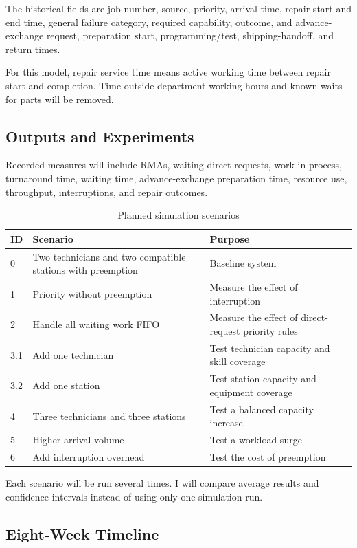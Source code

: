 \documentclass[12pt, letterpaper, twoside]{article}
\begin{document}
The historical fields are job number, source, priority, arrival time,
repair start and end time, general failure category, required capability, outcome, and
advance-exchange request, preparation start, programming/test, shipping-handoff, and return
times.

For this model, repair service time means active working time between repair start and
completion. Time outside department working hours and known waits for parts will be removed.


\subsection{Outputs and Experiments}

Recorded measures will include RMAs, waiting direct requests, work-in-process,
turnaround time, waiting time, advance-exchange preparation time, resource use,
throughput, interruptions, and repair outcomes.

\begin{table}[ht]
\centering
\caption{Planned simulation scenarios}
\small
\begin{tabular}{p{0.35in} p{2.15in} p{2.4in}}
\toprule
\textbf{ID} & \textbf{Scenario} & \textbf{Purpose} \\
\midrule
0 & Two technicians and two compatible stations with preemption & Baseline system \\
1 & Priority without preemption & Measure the effect of interruption \\
2 & Handle all waiting work FIFO & Measure the effect of direct-request priority rules \\
3.1 & Add one technician & Test technician capacity and skill coverage \\
3.2 & Add one station & Test station capacity and equipment coverage \\
4 & Three technicians and three stations & Test a balanced capacity increase \\
5 & Higher arrival volume & Test a workload surge \\
6 & Add interruption overhead & Test the cost of preemption \\
\bottomrule
\end{tabular}
\end{table}

Each scenario will be run several times. I will compare average results and confidence
intervals instead of using only one simulation run.

\subsection{Eight-Week Timeline}
\end{document}
